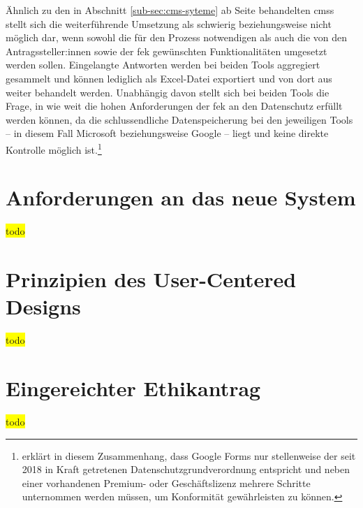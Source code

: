 \documentclass[a4paper,12pt,twoside]{scrreprt}
\begin{document}
Ähnlich zu den in Abschnitt \ref{sub-sec:cms-syteme} ab Seite \pageref{sub-sec:cms-syteme} behandelten \aclp{cms} stellt sich die weiterführende Umsetzung  als schwierig beziehungsweise nicht möglich dar, wenn sowohl die für den Prozess notwendigen als auch die von den Antragssteller:innen sowie der \ac{fek} gewünschten Funktionalitäten umgesetzt werden sollen. Eingelangte Antworten werden bei beiden Tools aggregiert gesammelt und können lediglich als Excel-Datei exportiert und von dort aus weiter behandelt werden. \cite{microsoft_corporation_wie_2021, google_ireland_limited_ergebnisse_2023} Unabhängig davon stellt sich bei beiden Tools die Frage, in wie weit die hohen Anforderungen der \acl{fek} an den Datenschutz erfüllt werden können, da die schlussendliche Datenspeicherung bei den jeweiligen Tools -- in diesem Fall Microsoft beziehungsweise Google -- liegt und keine direkte Kontrolle möglich ist.\footnote{\cite{visitor_analytics_gmbh_ist_2022} erklärt in diesem Zusammenhang, dass Google Forms nur stellenweise der seit 2018 in Kraft getretenen Datenschutzgrundverordnung entspricht und neben einer vorhandenen Premium- oder Geschäftslizenz mehrere Schritte unternommen werden müssen, um Konformität gewährleisten zu können.}

\chapter{Anforderungen an das neue System}
\label{chap:anforderung-neues-system}

\colorbox{yellow}{todo}

\chapter{Prinzipien des User-Centered Designs}
\label{chap:prinzipien-user-centered-design}

\colorbox{yellow}{todo}

\clearpage
{}
{}
\printbibliography

\appendix

\chapter{Eingereichter Ethikantrag}
\label{appendix:eingereichter-ethikantrag}

\colorbox{yellow}{todo}


\end{document}
